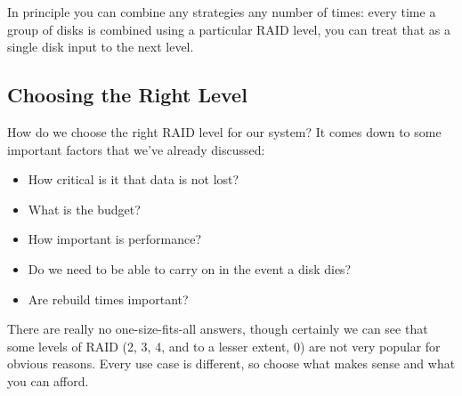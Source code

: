 In principle you can combine any strategies any number of times: every time a group of disks is combined using a particular RAID level, you can treat that as a single disk input to the next level.

\subsection*{Choosing the Right Level}
How do we choose the right RAID level for our system? It comes down to some important factors that we've already discussed:

\begin{itemize}
	\item How critical is it that data is not lost?
	\item What is the budget?
	\item How important is performance?
	\item Do we need to be able to carry on in the event a disk dies?
	\item Are rebuild times important?
\end{itemize}

There are really no one-size-fits-all answers, though certainly we can see that some levels of RAID (2, 3, 4, and to a lesser extent, 0) are not very popular for obvious reasons. Every use case is different, so choose what makes sense and what you can afford.



